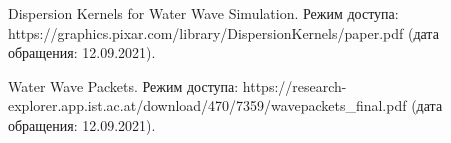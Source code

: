 
\begin{thebibliography}{9}

 Dispersion Kernels for Water Wave Simulation. Режим доступа: https://graphics.pixar.com/library/DispersionKernels/paper.pdf (дата обращения: 12.09.2021).

 Water Wave Packets. Режим доступа: https://research-explorer.app.ist.ac.at/download/470/7359/wavepackets\_final.pdf (дата обращения: 12.09.2021).

\end{thebibliography}